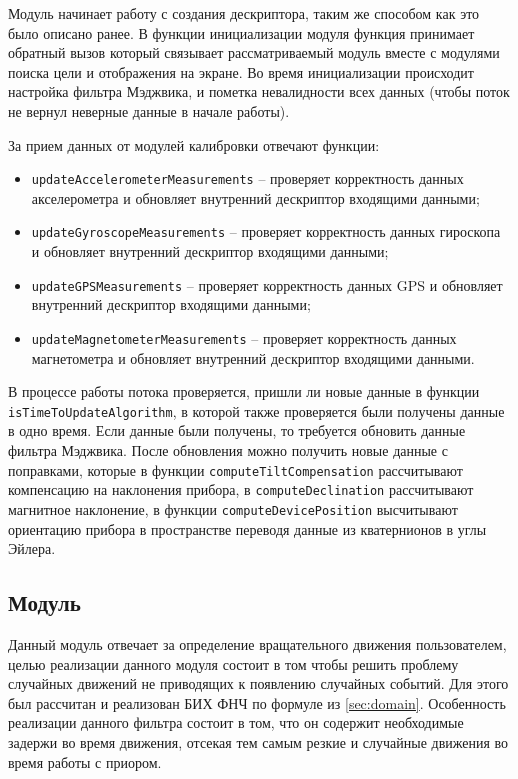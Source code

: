 Модуль начинает работу с создания дескриптора, таким же способом как это было описано ранее. В функции инициализации модуля
функция принимает обратный вызов который связывает рассматриваемый модуль вместе с модулями поиска цели и отображения на экране.
Во время инициализации происходит настройка фильтра Мэджвика, и пометка невалидности всех данных (чтобы поток не вернул неверные данные в начале работы).

За прием данных от модулей калибровки отвечают функции:
\begin{itemize}
    \item \lstinline{updateAccelerometerMeasurements} -- проверяет корректность данных акселерометра и обновляет внутренний дескриптор входящими данными;
    \item \lstinline{updateGyroscopeMeasurements} -- проверяет корректность данных гироскопа и обновляет внутренний дескриптор входящими данными;
    \item \lstinline{updateGPSMeasurements} -- проверяет корректность данных GPS и обновляет внутренний дескриптор входящими данными;
    \item \lstinline{updateMagnetometerMeasurements} -- проверяет корректность данных магнетометра и обновляет внутренний дескриптор входящими данными.
\end{itemize}


В процессе работы потока проверяется, пришли ли новые данные в функции \lstinline{isTimeToUpdateAlgorithm}, в которой также проверяется были получены данные в
одно время. Если данные были получены, то требуется обновить данные фильтра Мэджвика. После обновления можно получить новые данные с поправками, которые в функции
\lstinline{computeTiltCompensation} рассчитывают компенсацию на наклонения прибора, в \lstinline{computeDeclination} рассчитывают  магнитное наклонение, в функции
\lstinline{computeDevicePosition} высчитывают ориентацию прибора в пространстве переводя данные из кватернионов в углы Эйлера.

\subsection{Модуль \moduleMoveDetect}

Данный модуль отвечает за определение вращательного движения пользователем, целью реализации данного модуля состоит в том чтобы решить проблему случайных движений не
приводящих к появлению случайных событий. Для этого был рассчитан и реализован БИХ ФНЧ по формуле из \ref{sec:domain}. Особенность реализации данного фильтра состоит в том,
что он содержит необходимые задержи во время движения, отсекая тем самым резкие и случайные движения во время работы с приором. 

